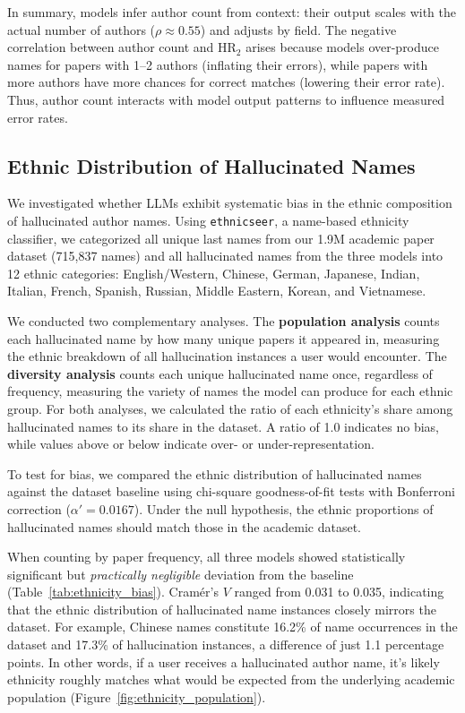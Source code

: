 \documentclass[11pt]{article}
\begin{document}
In summary, models infer author count from context: their output scales with the actual number of authors ($\rho \approx 0.55$) and adjusts by field. The negative correlation between author count and HR$_2$ arises because models over-produce names for papers with 1--2 authors (inflating their errors), while papers with more authors have more chances for correct matches (lowering their error rate). Thus, author count interacts with model output patterns to influence measured error rates.

\subsection{Ethnic Distribution of Hallucinated Names
\label{sec:ethnicity}}
We investigated whether LLMs exhibit systematic bias in the ethnic composition of hallucinated author names. Using \texttt{ethnicseer}, a name-based ethnicity classifier, we categorized all unique last names from our 1.9M academic paper dataset (715,837 names) and all hallucinated names from the three models into 12 ethnic categories: English/Western, Chinese, German, Japanese, Indian, Italian, French, Spanish, Russian, Middle Eastern, Korean, and Vietnamese.

We conducted two complementary analyses. The \textbf{population analysis} counts each hallucinated name by how many unique papers it appeared in, measuring the ethnic breakdown of all hallucination instances a user would encounter. The \textbf{diversity analysis} counts each unique hallucinated name once, regardless of frequency, measuring the variety of names the model can produce for each ethnic group. For both analyses, we calculated the ratio of each ethnicity's share among hallucinated names to its share in the dataset. A ratio of 1.0 indicates no bias, while values above or below indicate over- or under-representation.

To test for bias, we compared the ethnic distribution of hallucinated names against the dataset baseline using chi-square goodness-of-fit tests with Bonferroni correction ($\alpha' = 0.0167$). Under the null hypothesis, the ethnic proportions of hallucinated names should match those in the academic dataset.

When counting by paper frequency, all three models showed statistically significant but \textit{practically negligible} deviation from the baseline (Table~\ref{tab:ethnicity_bias}). Cramér's $V$ ranged from 0.031 to 0.035, indicating that the ethnic distribution of hallucinated name instances closely mirrors the dataset. For example, Chinese names constitute 16.2\% of name occurrences in the dataset and 17.3\% of hallucination instances, a difference of just 1.1 percentage points. In other words, if a user receives a hallucinated author name, it's likely ethnicity roughly matches what would be expected from the underlying academic population (Figure~\ref{fig:ethnicity_population}).
\end{document}
